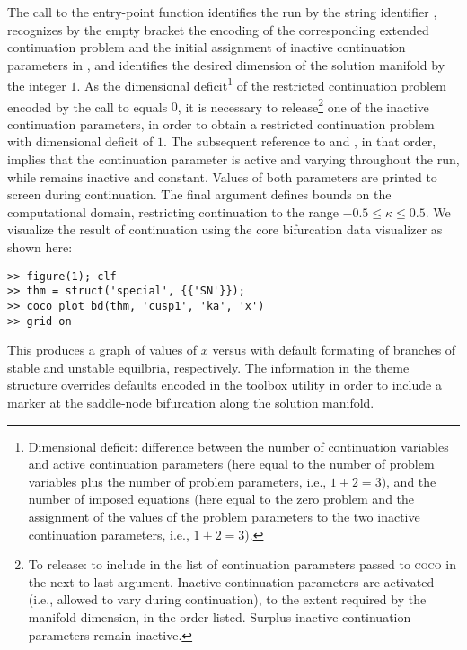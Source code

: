 The call to the  entry-point function identifies the run by the string identifier , recognizes by the empty bracket the encoding of the corresponding extended continuation problem and the initial assignment of inactive continuation parameters in , and identifies the desired dimension of the solution manifold by the integer $1$. As the dimensional deficit\footnote{Dimensional deficit: difference between the number of continuation variables and active continuation parameters (here equal to the number of problem variables plus the number of problem parameters, i.e., $1+2=3$), and the number of imposed equations (here equal to the zero problem and the assignment of the values of the problem parameters to the two inactive continuation parameters, i.e., $1+2=3$).} of the restricted continuation problem encoded by the call to  equals $0$, it is necessary to release\footnote{To release: to include in the list of continuation parameters passed to \textsc{coco} in the next-to-last argument. Inactive continuation parameters are activated (i.e., allowed to vary during continuation), to the extent required by the manifold dimension, in the order listed. Surplus inactive continuation parameters remain inactive.} one of the inactive continuation parameters, in order to obtain a restricted continuation problem with dimensional deficit of $1$. The subsequent reference to  and , in that order, implies that the continuation parameter  is active and varying throughout the run, while  remains inactive and constant. Values of both parameters are printed to screen during continuation. The final argument defines bounds on the computational domain, restricting continuation to the range \mbox{$-0.5\le\kappa\le 0.5$}. We visualize the result of continuation using the core bifurcation data visualizer  as shown here:
\begin{lstlisting}[language=coco-highlight]
>> figure(1); clf
>> thm = struct('special', {{'SN'}});
>> coco_plot_bd(thm, 'cusp1', 'ka', 'x')
>> grid on
\end{lstlisting}
This produces a graph of values of $x$ versus  with default formating of branches of stable and unstable equilbria, respectively. The information in the  theme structure overrides defaults encoded in the toolbox utility  in order to include a marker at the saddle-node bifurcation along the solution manifold.

